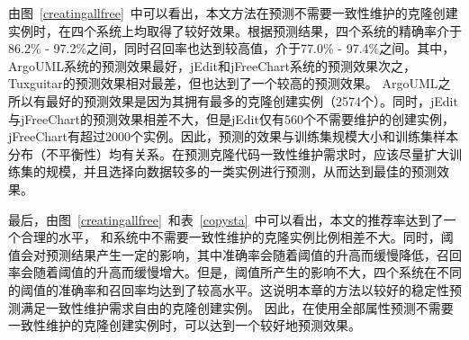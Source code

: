 由图~\ref{creatingallfree}~中可以看出，本文方法在预测不需要一致性维护的克隆创建实例时，在四个系统上均取得了较好效果。根据预测结果，四个系统的精确率介于86.2\% - 97.2\%之间，同时召回率也达到较高值，介于77.0\% - 97.4\%之间。其中，ArgoUML系统的预测效果最好，jEdit和jFreeChart系统的预测效果次之，Tuxguitar的预测效果相对最差，但也达到了一个较高的预测效果。
ArgoUML之所以有最好的预测效果是因为其拥有最多的克隆创建实例（2574个）。同时，jEdit与jFreeChart的预测效果相差不大，但是jEdit仅有560个不需要维护的创建实例，jFreeChart有超过2000个实例。因此，预测的效果与训练集规模大小和训练集样本分布（不平衡性）均有关系。在预测克隆代码一致性维护需求时，应该尽量扩大训练集的规模，并且选择向数据较多的一类实例进行预测，从而达到最佳的预测效果。

最后，由图~\ref{creatingallfree}~和表~\ref{copysta}~中可以看出，本文的推荐率达到了一个合理的水平， 和系统中不需要一致性维护的克隆实例比例相差不大。同时，阈值会对预测结果产生一定的影响，其中准确率会随着阈值的升高而缓慢降低，召回率会随着阈值的升高而缓慢增大。但是，阈值所产生的影响不大，四个系统在不同的阈值的准确率和召回率均达到了较高水平。这说明本章的方法以较好的稳定性预测满足一致性维护需求自由的克隆创建实例。
因此，在使用全部属性预测不需要一致性维护的克隆创建实例时，可以达到一个较好地预测效果。




